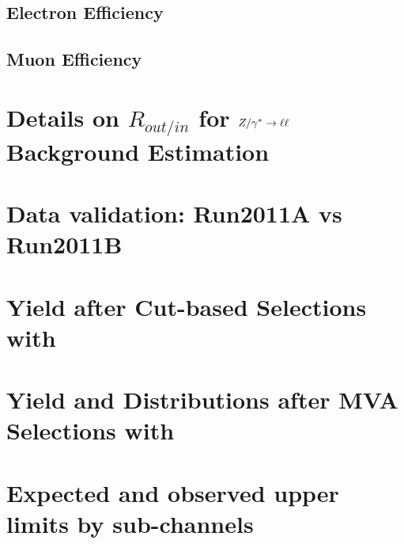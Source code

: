 \documentclass{cmspaper}
\begin{document}
     \subsection{Electron Efficiency}
     
     \subsection{Muon Efficiency}
     

\clearpage 

\section{ Details on $R_{out/in}$ for $Z/\gamma^*\to\ell\ell$ Background Estimation}
     \label{app:appendix_dyr}
     
\clearpage



  \section{Data validation: Run2011A vs Run2011B}
     \label{app:a_vs_b}

\clearpage 

  \section{Yield after Cut-based Selections with \intlumi }
     \label{app:appendix_cutresults}
     
\clearpage

  \section{Yield and Distributions after MVA Selections with \intlumi }
     \label{app:appendix_bdtresults}
     

\clearpage

  \section{Expected and observed upper limits by sub-channels}
     \label{app:subchannels}
     
 
%  
\end{document}
